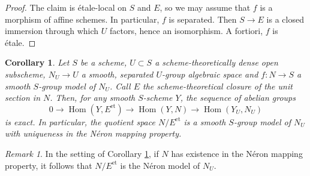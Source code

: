 \documentclass[a4paper,10pt,twoside]{article}
\newcommand{\on}[1]{\operatorname{#1}}
\DeclareMathOperator{\Hom}{Hom}
\DeclareMathOperator{\ab}{Ab}
\newtheorem{cor}[thm]{Corollary}
\newtheorem{prop}[thm]{Proposition}
\theoremstyle{definition}
\theoremstyle{remark}
\newtheorem{rem}{Remark}[thm]
\renewcommand{\on}[1]{\operatorname{#1}}
\newcommand{\sm}[1]{{{#1}_{\operatorname{sm}}}}
\begin{document}
\begin{proof}
The claim is étale-local on $S$ and $E$, so we may assume that $f$ is a morphism of affine schemes. In particular, $f$ is separated. Then $S \to E$ is a closed immersion through which $U$ factors, hence an isomorphism. A fortiori, $f$ is étale.
\end{proof}

\begin{cor}\label{corollary:quotient_of_group_space_by_E^et_has_uniqueness_in_NMP}
Let $S$ be a scheme, $U\subset S$ a scheme-theoretically dense open subscheme, $N_U \to U$ a smooth, separated $U$-group algebraic space and $f\colon N \to S$ a smooth $S$-group model of $N_U$. Call $E$ the scheme-theoretical closure of the unit section in $N$. Then, for any smooth $S$-scheme $Y$, the sequence of abelian groups
\[
0 \to \Hom(Y,E^{\on{et}}) \to \Hom(Y,N) \to \Hom(Y_U,N_U)
\]
is exact. In particular, the quotient space $N/E^{\on{et}}$ is a smooth $S$-group model of $N_U$ with uniqueness in the Néron mapping property.
\end{cor}

\begin{rem}
In the setting of Corollary \ref{corollary:quotient_of_group_space_by_E^et_has_uniqueness_in_NMP}, if $N$ has existence in the Néron mapping property, it follows that $N/E^{\on{et}}$ is the Néron model of $N_U$.
\end{rem}


\end{document}
